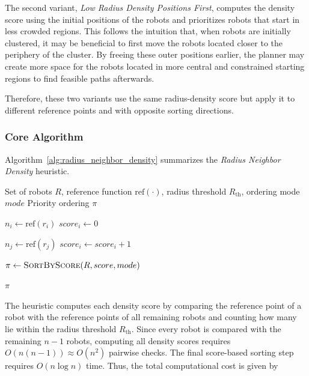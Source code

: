The second variant, \textit{Low Radius Density Positions First}, computes the density score using the initial positions of the robots and prioritizes robots that start in less crowded regions. This follows the intuition that, when robots are initially clustered, it may be beneficial to first move the robots located closer to the periphery of the cluster. By freeing these outer positions earlier, the planner may create more space for the robots located in more central and constrained starting regions to find feasible paths afterwards.

Therefore, these two variants use the same radius-density score but apply it to different reference points and with opposite sorting directions. 


\subsubsection{Core Algorithm}
\label{subsubsec:radius_neighbor_density_pseudocode}
\hspace{\parindent}
Algorithm~\ref{alg:radius_neighbor_density} summarizes the \textit{Radius Neighbor Density} heuristic. 

\begin{algorithm}[H]
\caption{Radius Neighbor Density Heuristic}
\label{alg:radius_neighbor_density}
\begin{algorithmic}[1]
\Require Set of robots \(R\), reference function \(\mathrm{ref}(\cdot)\), radius threshold \(R_{\text{th}}\), ordering mode \(mode\)
\Ensure Priority ordering \(\pi\)

    \State \(n_i \gets \mathrm{ref}(r_i)\) 
    \State \(score_i \gets 0\)

        \State \(n_j \gets \mathrm{ref}(r_j)\)
            \State \(score_i \gets score_i + 1\) 
        \EndIf
    \EndFor
\EndFor

\State \(\pi \gets \textsc{SortByScore}(R, score, mode)\)

\State \Return \(\pi\)
\end{algorithmic}
\end{algorithm}

The heuristic computes each density score by comparing the reference point of a robot with the reference points of all remaining robots and counting how many lie within the radius threshold \(R_{\text{th}}\). Since every robot is compared with the remaining \(n-1\) robots, computing all density scores requires \(O(n(n-1)) \approx O(n^2)\) pairwise checks. The final score-based sorting step requires \(O(n \log n)\) time.
Thus, the total computational cost is given by

